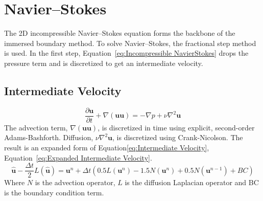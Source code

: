 \documentclass[onehalf,11pt]{beavtex}
\begin{document}
\section{Navier--Stokes}
\label{ID:Navier Stokes}

The 2D incompressible Navier--Stokes equation forms the backbone of the immersed boundary method.
To solve Navier--Stokes, the fractional step method is used.
In the first step, Equation~\eqref{eq:Incompressible NavierStokes} drops the pressure term and is discretized to get an intermediate velocity.

\subsection{Intermediate Velocity}
\label{ID:NS intermediate velocity}
\begin{equation}
\frac{\partial \textbf{u}}{\partial t} + \nabla ( \textbf{uu} ) = -\nabla p + \nu\nabla^{2}\textbf{u} \label{eq:Incompressible NavierStokes}
\end{equation}
The advection term, $\nabla (\textbf{uu})$, is discretized in time using explicit, second-order Adams-Bashforth.
Diffusion, $\nu \nabla^2 \textbf{u}$, is discretized using Crank-Nicolson.
The result is an expanded form of Equation\eqref{eq:Intermediate Velocity}, Equation~\eqref{eq:Expanded Intermediate Velocity}.
\begin{equation}
\label{eq:Expanded Intermediate Velocity}
\hat{\textbf{u}} - \frac{\Delta t}{2}L(\hat{\textbf{u}}) = \textbf{u}^n + \Delta t\left(0.5L(\textbf{u}^n) - 1.5N(\textbf{u}^n) + 0.5N(\textbf{u}^{n-1}) + BC\right)
\end{equation}
Where $N$ is the advection operator, $L$ is the diffusion Laplacian operator and BC is the boundary condition term.
\end{document}
